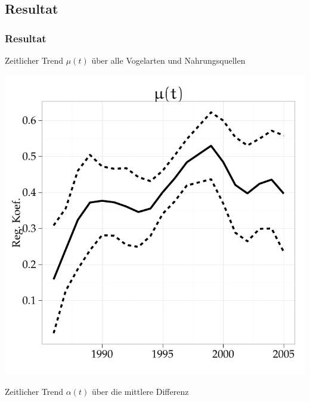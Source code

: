 \documentclass[xcolor=dvipsnames, compress, serif, professionalfont, handout]{beamer}
\newenvironment{knitrout}{}{} %
\renewenvironment{knitrout}{\begin{footnotesize}}{\end{footnotesize}}
\begin{document}
%
%

\subsection{Resultat}
\begin{frame}[fragile]
\frametitle{Resultat}


  \hspace{-0.1cm}   
  \begin{minipage}{0.48\textwidth}
      Zeitlicher Trend $\mu(t)$ \"uber alle Vogelarten und Nahrungsquellen
\begin{knitrout}
\color{fgcolor}

{\centering \includegraphics[width=\linewidth,height=\linewidth]{figure/graphics-GR_ANOVA_mu} 

}


\end{knitrout}

  \end{minipage} 
  \hspace{0.1cm}
  \begin{minipage}{0.48\textwidth}
  Zeitlicher Trend $\alpha(t)$ \"uber die mittlere Differenz 
\begin{knitrout}
\color{fgcolor}


\end{knitrout}
\end{minipage}
\end{frame}
\end{document}
